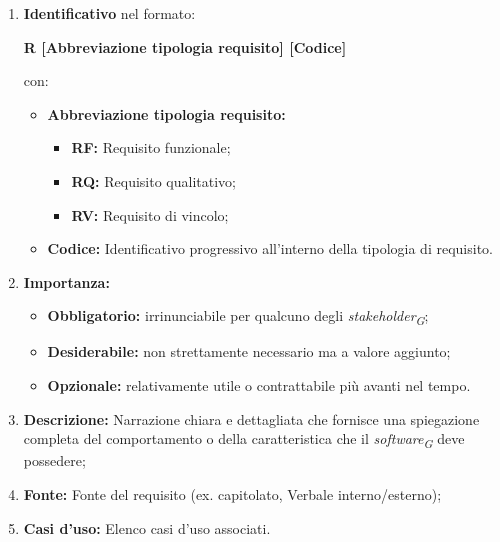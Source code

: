 \begin{enumerate}
    \item \textbf{Identificativo} nel formato:\\
          \begin{center}
              \textbf{R [Abbreviazione tipologia requisito] [Codice]}
          \end{center}
          con:
          \begin{itemize}
              \item \textbf{Abbreviazione tipologia requisito:}
                    \begin{itemize}
                        \item \textbf{RF:} Requisito funzionale;
                        \item \textbf{RQ:} Requisito qualitativo;
                        \item \textbf{RV:} Requisito di vincolo;
                    \end{itemize}
              \item \textbf{Codice:} Identificativo progressivo all'interno della tipologia di requisito.
          \end{itemize}
    \item \textbf{Importanza:}
          \begin{itemize}
              \item \textbf{Obbligatorio:} irrinunciabile per qualcuno degli \textit{stakeholder}\textsubscript{\textit{G}};
              \item \textbf{Desiderabile:} non strettamente necessario ma a valore aggiunto;
              \item \textbf{Opzionale:} relativamente utile o contrattabile più avanti nel tempo.
          \end{itemize}
    \item \textbf{Descrizione:} Narrazione chiara e dettagliata che fornisce una spiegazione completa del comportamento o della caratteristica che il \textit{software}\textsubscript{\textit{G}} deve possedere;
    \item \textbf{Fonte:} Fonte del requisito (ex. capitolato, Verbale interno/esterno);
    \item \textbf{Casi d'uso:} Elenco casi d'uso associati.
\end{enumerate}
